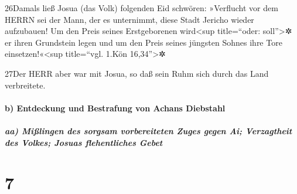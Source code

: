 26Damals ließ Josua (das Volk) folgenden Eid schwören: »Verflucht vor
dem HERRN sei der Mann, der es unternimmt, diese Stadt Jericho wieder
aufzubauen! Um den Preis seines Erstgeborenen wird\textless sup
title=``oder: soll''\textgreater✲ er ihren Grundstein legen und um den
Preis seines jüngsten Sohnes ihre Tore einsetzen!«\textless sup
title=``vgl. 1.Kön 16,34''\textgreater✲

27Der HERR aber war mit Josua, so daß sein Ruhm sich durch das Land
verbreitete.

\hypertarget{b-entdeckung-und-bestrafung-von-achans-diebstahl}{%
\paragraph{b) Entdeckung und Bestrafung von Achans
Diebstahl}\label{b-entdeckung-und-bestrafung-von-achans-diebstahl}}

\hypertarget{aa-miuxdflingen-des-sorgsam-vorbereiteten-zuges-gegen-ai-verzagtheit-des-volkes-josuas-flehentliches-gebet}{%
\subparagraph{aa) Mißlingen des sorgsam vorbereiteten Zuges gegen Ai;
Verzagtheit des Volkes; Josuas flehentliches
Gebet}\label{aa-miuxdflingen-des-sorgsam-vorbereiteten-zuges-gegen-ai-verzagtheit-des-volkes-josuas-flehentliches-gebet}}

\hypertarget{section-6}{%
\section{7}\label{section-6}}

